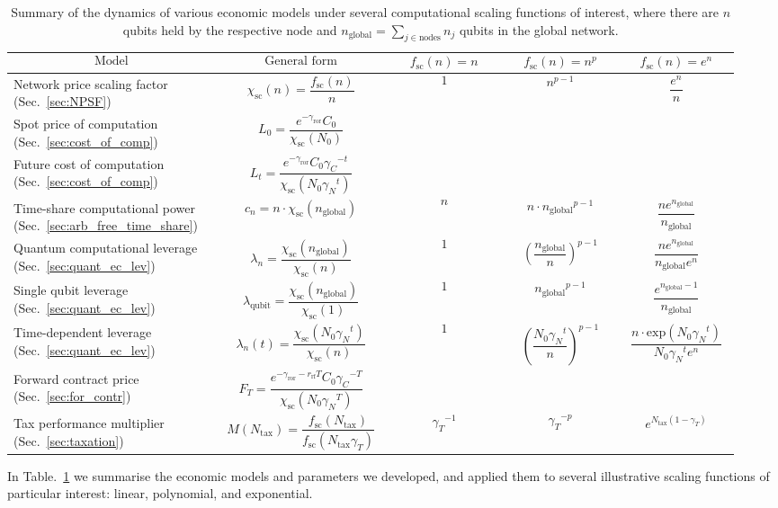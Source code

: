 \begin{table}[!htb]
\caption{Summary of the dynamics of various economic models under several computational scaling functions of interest, where there are $n$ qubits held by the respective node and \mbox{$n_\text{global}=\sum_{j\in \text{nodes}} n_j$} qubits in the global network.} \label{tab:summary_ec_models}
\begin{tabular}{|p{0.255\linewidth}|p{0.22\linewidth}|p{0.155\linewidth}|p{0.155\linewidth}|p{0.155\linewidth}|}
	\hline
	\[\text{Model}\] & \[\text{General form}\] & \[f_\text{sc}(n)=n^{}\] & \[f_\text{sc}(n)=n^p\] & \[f_\text{sc}(n)=e^n\]\\
	\hline \hline
	Network price scaling factor (Sec.~\ref{sec:NPSF}) & \[\chi_\text{sc}(n)=\frac{f_\text{sc}(n)}{n}\] & \[1\] & \[n^{p-1}\] & \[\frac{e^n}{n}\]\\
	\hline
	Spot price of computation (Sec.~\ref{sec:cost_of_comp}) & \[L_0=\frac{e^{-\gamma_\text{ror}} C_0}{\chi_\text{sc}(N_0)}\] & &  & \\
	\hline
	Future cost of computation (Sec.~\ref{sec:cost_of_comp}) & \[L_t=\frac{e^{-\gamma_\text{ror}} C_0{\gamma_C}^{-t}}{\chi_\text{sc}(N_0 {\gamma_N}^t)}
\] &  &  & \\
	\hline
	Time-share computational power (Sec.~\ref{sec:arb_free_time_share}) & \[c_n=n \cdot \chi_\text{sc}(n_\text{global})
\] & \[n\] & \[n\cdot{n_\text{global}}^{p-1}\] & \[\frac{n e^{n_\text{global}}}{n_\text{global}}\]\\
	\hline
	Quantum computational leverage (Sec.~\ref{sec:quant_ec_lev}) & \[\lambda_n=\frac{\chi_\text{sc}(n_\text{global})}{\chi_\text{sc}(n)}\] & \[1\] & \[\left(\frac{n_\text{global}}{n}\right)^{p-1}\] & \[\frac{n e^{n_\text{global}}}{n_\text{global}e^n}\]\\
	\hline
	Single qubit leverage (Sec.~\ref{sec:quant_ec_lev}) & \[\lambda_\text{qubit}=\frac{\chi_\text{sc}(n_\text{global})}{\chi_\text{sc}(1)}\] & \[1\] & \[{n_\text{global}}^{p-1}\] & \[\frac{e^{n_\text{global}-1}}{n_\text{global}}\]\\
	\hline
	Time-dependent leverage (Sec.~\ref{sec:quant_ec_lev}) & \[\lambda_n(t)=\frac{\chi_\text{sc}(N_0{\gamma_N}^t)}{\chi_\text{sc}(n)}\] &  \[1\] & \[\left(\frac{N_0{\gamma_N}^t}{n}\right)^{p-1}\] & \[\frac{n \cdot \text{exp}(N_0{\gamma_N}^t)}{N_0{\gamma_N}^t e^n}\]\\
	\hline
	Forward contract price (Sec.~\ref{sec:for_contr}) & \[F_T=\frac{e^{-\gamma_\text{ror}-r_\text{rf}T} C_0{\gamma_C}^{-T}}{\chi_\text{sc}(N_0 {\gamma_N}^T)}\]
 &  & & \\
	\hline
	Tax performance multiplier (Sec.~\ref{sec:taxation}) & \[M(N_\text{tax})=\frac{f_\text{sc}(N_\text{tax})}{f_\text{sc}(N_\text{tax} \gamma_T)}\] & \[{\gamma_T}^{-1}\] & \[{\gamma_T}^{-p}\] & \[e^{N_\text{tax}(1-\gamma_T)}\]\\
	\hline
\end{tabular}
\end{table}

\renewcommand{\arraystretch}{1}
\renewcommand{\tablename}{ALG.}

In Table.~\ref{tab:summary_ec_models} we summarise the economic models and parameters we developed, and applied them to several illustrative scaling functions of particular interest: linear, polynomial, and exponential.